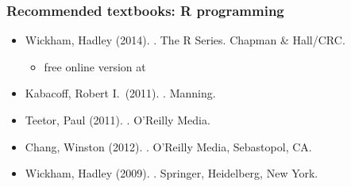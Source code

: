 \documentclass[t]{beamer} %
\begin{document}
\begin{frame}
  \frametitle{Recommended textbooks: R programming}

  \small
  \begin{itemize}
  \item Wickham, Hadley (2014). . The R Series. Chapman \& Hall/CRC. \secondary{[\texteuro 50]}
    \begin{itemize}
    \item free online version at 
      \\[1ex]
    \end{itemize}
  \item Kabacoff, Robert I.\ (2011). . Manning. \secondary{[\texteuro 40]}
    \\[1ex]
  \item Teetor, Paul (2011). . O'Reilly Media. \secondary{[\texteuro 25]}
    \\[1ex]
  \item Chang, Winston (2012). . O'Reilly Media, Sebastopol, CA. \secondary{[\texteuro 25]}
    \\[1ex]
  \item Wickham, Hadley (2009). . Springer, Heidelberg, New York. \secondary{[\texteuro 57]}
  \end{itemize}
\end{frame}
\end{document}
